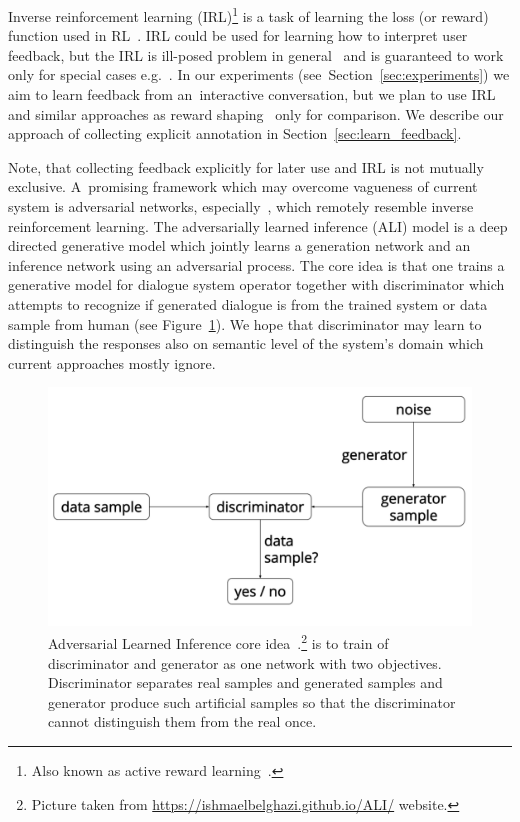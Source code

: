 \documentclass[11pt]{article}
\begin{document}
Inverse reinforcement learning (IRL)\footnote{Also known as active reward learning~\cite{su2016active}.} is a task of learning the loss (or reward) function used in RL~\cite{abbeel_apprenticeship_2004}.
IRL could be used for learning how to interpret user feedback, but the IRL is ill-posed problem in general~\cite{choi_inverse_2011} and is guaranteed to work only for special cases e.g.~\cite{abbeel_apprenticeship_2004,choi_inverse_2011}.  
In our experiments (see~Section~\ref{sec:experiments}) we aim to learn feedback from an~interactive conversation, but we plan to use IRL and similar approaches as reward shaping~\cite{su2016active} only for comparison.
We describe our approach of collecting explicit annotation in Section~\ref{sec:learn_feedback}.

Note, that collecting feedback explicitly for later use and IRL is not mutually exclusive.
A~promising framework which may overcome vagueness of current system is adversarial networks, especially~\cite{dumoulin_adversarially_2016}, which remotely resemble inverse reinforcement learning.
The adversarially learned inference (ALI) model is a deep directed generative model which jointly learns a generation network and an inference network using an adversarial process. 
The core idea is that one trains a generative model for dialogue system operator together with discriminator which attempts to recognize if generated dialogue is from the trained system or data sample from human (see Figure~\ref{fig:gan}).
We hope that discriminator may learn to distinguish the responses also on semantic level of the system's domain which current approaches mostly ignore. 

\begin{figure}[htpb]
    \centering
    \includegraphics[width=0.8\linewidth]{gan_simple}
    \caption{Adversarial Learned Inference core idea~\cite{dumoulin_adversarially_2016}.\footnote{Picture taken from \url{https://ishmaelbelghazi.github.io/ALI/} website.} is to train of discriminator and generator as one network with two objectives. Discriminator separates real samples and generated samples and generator produce such artificial samples so that the discriminator cannot distinguish them from the real once.}
\label{fig:gan}
\end{figure}
\end{document}
